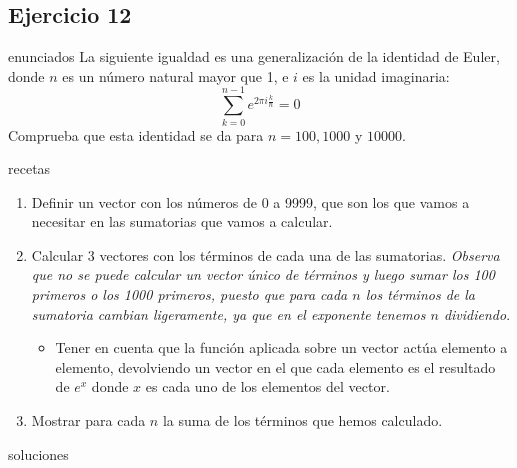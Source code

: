 \subsection{Ejercicio 12}
\def\parte{enunciados}
\ifx\capitulo\parte
La siguiente igualdad es una generalización de la identidad de Euler, donde $n$ es un número natural mayor que 1, e $i$ es la unidad imaginaria:
\[\sum_{k = 0}^{n-1}e^{2\pi i \frac{k}{n}} = 0\]
Comprueba que esta identidad se da para $n = 100, 1000$ y $10000$.
\fi

\def\parte{recetas}
\ifx\capitulo\parte
\begin{enumerate}
\item Definir un vector con los números de 0 a 9999, que son los que vamos a necesitar en las sumatorias que vamos a calcular.
\item Calcular 3 vectores con los términos de cada una de las sumatorias. \textit{Observa que no se puede calcular un vector único de términos y luego sumar los 100 primeros o los 1000 primeros, puesto que para cada $n$ los términos de la sumatoria cambian ligeramente, ya que en el exponente tenemos $n$ dividiendo}.
  \begin{itemize}
  \item Tener en cuenta que la función  aplicada sobre un vector actúa elemento a elemento, devolviendo un vector en el que cada elemento es el resultado de $e^x$ donde $x$ es cada uno de los elementos del vector.
  \end{itemize}
\item Mostrar para cada $n$ la suma de los términos que hemos calculado.
\end{enumerate}
\fi

\def\parte{soluciones}
\ifx\capitulo\parte

\fi
